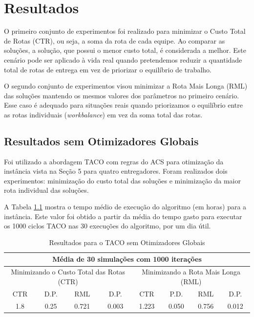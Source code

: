 \chapter{Resultados}


O primeiro conjunto de experimentos foi realizado para minimizar o Custo Total de Rotas (CTR), ou seja, a soma da rota de cada equipe. Ao comparar as soluções, a solução, que possui o menor custo total, é considerada a melhor. Este cenário pode ser aplicado à vida real quando pretendemos reduzir a quantidade total de rotas de entrega em vez de priorizar o equilíbrio de trabalho.

O segundo conjunto de experimentos visou minimizar a Rota Mais Longa (RML) das soluções mantendo os mesmos valores dos parâmetros no primeiro cenário. Esse caso é adequado para situações reais quando priorizamos o equilíbrio entre as rotas individuais (\textit{workbalance}) em vez da soma total das rotas.

\section{Resultados sem Otimizadores Globais}
\label{sec-resultados-taco}

Foi utilizado a abordagem TACO com regras do ACS para otimização da instância vista na Seção 5 para quatro entregadores. Foram realizados dois experimentos: minimização do custo total das soluções e minimização da maior rota individual das soluções.

A Tabela \ref{tab:resultado-taco} mostra o tempo médio de execução do algoritmo (em horas) para a instância. Este valor foi obtido a partir da média do tempo gasto para executar os 1000 ciclos TACO nas 30 execuções do algoritmo, por um dia útil.

\begin{table}[htb]
    \centering
    \caption{Resultados para o TACO sem Otimizadores Globais} \label{tab:resultado-taco}
\begin{tabular}{|c|c|c|c|c|c|c|c|}
\hline
\multicolumn{8}{|c|}{Média de 30 simulações com 1000 iterações}                                                            \\ \hline
\multicolumn{4}{|c|}{Minimizando o Custo Total das Rotas (CTR)} & \multicolumn{4}{c|}{Minimizando a Rota Mais Longa (RML)} \\ \hline
CTR           & D.P.          & RML            & D.P.           & CTR           & P.D.         & RML         & D.P.        \\ \hline
1.8           & 0.25          & 0.721          & 0.003          & 1.223         & 0.050        & 0.756       & 0.012       \\ \hline
\end{tabular}
\end{table}

